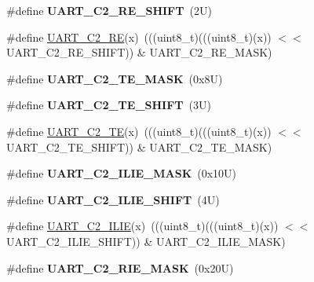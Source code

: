 \begin{DoxyCompactItemize}
\#define {\bfseries U\+A\+R\+T\+\_\+\+C2\+\_\+\+R\+E\+\_\+\+S\+H\+I\+FT}~(2\+U)
\item 
\#define \mbox{\hyperlink{group___u_a_r_t___register___masks_gabc3ac11f306e028e40b72324f9ad2134}{U\+A\+R\+T\+\_\+\+C2\+\_\+\+RE}}(x)~(((uint8\+\_\+t)(((uint8\+\_\+t)(x)) $<$$<$ U\+A\+R\+T\+\_\+\+C2\+\_\+\+R\+E\+\_\+\+S\+H\+I\+FT)) \& U\+A\+R\+T\+\_\+\+C2\+\_\+\+R\+E\+\_\+\+M\+A\+SK)
\item 
\mbox{\label{group___u_a_r_t___register___masks_ga3ac02e42b689641339aadf50ba868492}} 
\#define {\bfseries U\+A\+R\+T\+\_\+\+C2\+\_\+\+T\+E\+\_\+\+M\+A\+SK}~(0x8\+U)
\item 
\mbox{\label{group___u_a_r_t___register___masks_ga249d6d4f12178dac9cb19afecf1b165c}} 
\#define {\bfseries U\+A\+R\+T\+\_\+\+C2\+\_\+\+T\+E\+\_\+\+S\+H\+I\+FT}~(3\+U)
\item 
\#define \mbox{\hyperlink{group___u_a_r_t___register___masks_ga5d3a9fe7e0515bf26c00deeb9feee1f7}{U\+A\+R\+T\+\_\+\+C2\+\_\+\+TE}}(x)~(((uint8\+\_\+t)(((uint8\+\_\+t)(x)) $<$$<$ U\+A\+R\+T\+\_\+\+C2\+\_\+\+T\+E\+\_\+\+S\+H\+I\+FT)) \& U\+A\+R\+T\+\_\+\+C2\+\_\+\+T\+E\+\_\+\+M\+A\+SK)
\item 
\mbox{\label{group___u_a_r_t___register___masks_ga646831f578232754b613c506d70eb282}} 
\#define {\bfseries U\+A\+R\+T\+\_\+\+C2\+\_\+\+I\+L\+I\+E\+\_\+\+M\+A\+SK}~(0x10\+U)
\item 
\mbox{\label{group___u_a_r_t___register___masks_gaccb0ebb3f9bca9de659c4935cd895b06}} 
\#define {\bfseries U\+A\+R\+T\+\_\+\+C2\+\_\+\+I\+L\+I\+E\+\_\+\+S\+H\+I\+FT}~(4\+U)
\item 
\#define \mbox{\hyperlink{group___u_a_r_t___register___masks_ga474c8e26d806cf79cbddfdf496fc0364}{U\+A\+R\+T\+\_\+\+C2\+\_\+\+I\+L\+IE}}(x)~(((uint8\+\_\+t)(((uint8\+\_\+t)(x)) $<$$<$ U\+A\+R\+T\+\_\+\+C2\+\_\+\+I\+L\+I\+E\+\_\+\+S\+H\+I\+FT)) \& U\+A\+R\+T\+\_\+\+C2\+\_\+\+I\+L\+I\+E\+\_\+\+M\+A\+SK)
\item 
\mbox{\label{group___u_a_r_t___register___masks_gaa2cb31ebff38bb70191a8852eb0216aa}} 
\#define {\bfseries U\+A\+R\+T\+\_\+\+C2\+\_\+\+R\+I\+E\+\_\+\+M\+A\+SK}~(0x20\+U)
\item 
$$
\end{DoxyCompactItemize}
